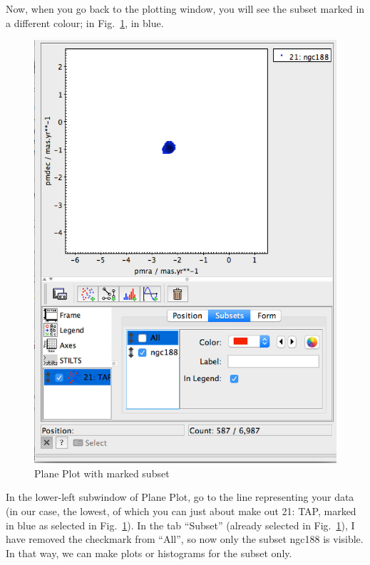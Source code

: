\documentclass[twocolumn,apj]{openjournal}
\begin{document}
Now, when you go back to the plotting window, you will see the subset marked in a different colour; in Fig.~\ref{SubsetPlot}, in blue. 
\begin{figure}[htbp]
\begin{center}
\includegraphics[width=\linewidth]{subsetControl.jpg}
\caption{Plane Plot with marked subset}
\label{SubsetPlot}
\end{center}
\end{figure}
In the lower-left subwindow of Plane Plot, go to the line representing your data (in our case, the lowest, of which you can just about make out 21: TAP, marked in blue as selected in Fig.~\ref{SubsetPlot}). In the tab ``Subset'' (already selected in Fig.~\ref{SubsetPlot}), I have removed the checkmark from ``All'', so now only the subset ngc188 is visible. In that way, we can make plots or histograms for the subset only.  
\end{document}
